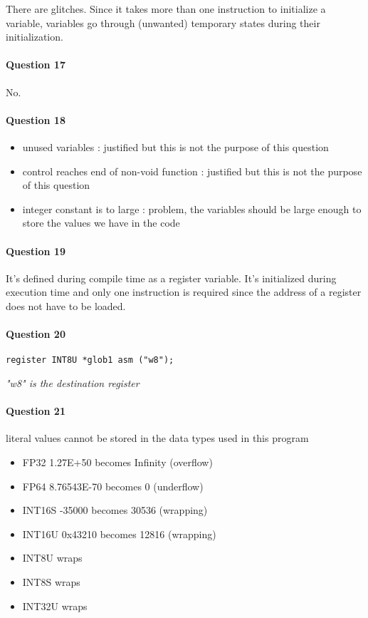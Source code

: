 \documentclass[10pt]{article}
\begin{document}
There are glitches. Since it takes more than one instruction to initialize a variable, variables go through (unwanted) temporary states during their initialization.


\paragraph{Question 17}

No.


\paragraph{Question 18}

\begin{itemize}
\item unused variables : justified but this is not the purpose of this question
\item control reaches end of non-void function : justified but this is not the purpose of this question
\item integer constant is to large : problem, the variables should be large enough to store the values we have in the code
\end{itemize}


\paragraph{Question 19}

It's defined during compile time as a register variable.
It's initialized during execution time and only one instruction is required since the address of a register does not have to be loaded.


\paragraph{Question 20}

\verb!register INT8U *glob1 asm ("w8");!

\emph{"w8" is the destination register}


\paragraph{Question 21}

literal values cannot be stored in the data types used in this program

\begin{itemize}
\item{FP32} 1.27E+50 becomes Infinity (overflow)
\item{FP64} 8.76543E-70 becomes 0 (underflow)
\item{INT16S} -35000 becomes 30536 (wrapping)
\item{INT16U} 0x43210 becomes 12816 (wrapping)
\item{INT8U} wraps
\item{INT8S} wraps
\item{INT32U} wraps
\end{itemize}
\end{document}
